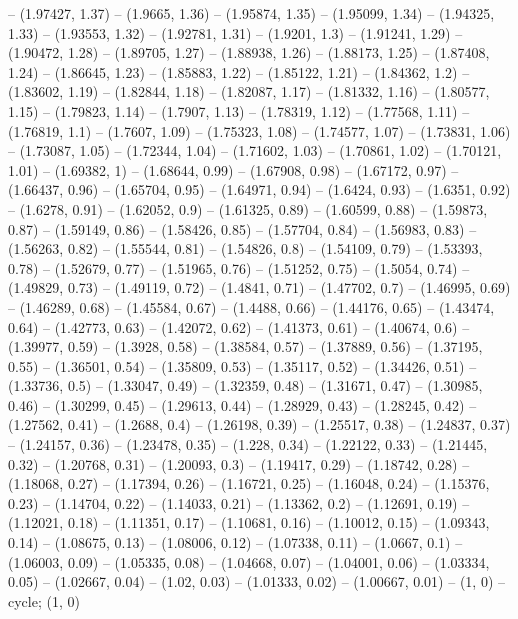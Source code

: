 -- (1.97427, 1.37)
-- (1.9665, 1.36)
-- (1.95874, 1.35)
-- (1.95099, 1.34)
-- (1.94325, 1.33)
-- (1.93553, 1.32)
-- (1.92781, 1.31)
-- (1.9201, 1.3)
-- (1.91241, 1.29)
-- (1.90472, 1.28)
-- (1.89705, 1.27)
-- (1.88938, 1.26)
-- (1.88173, 1.25)
-- (1.87408, 1.24)
-- (1.86645, 1.23)
-- (1.85883, 1.22)
-- (1.85122, 1.21)
-- (1.84362, 1.2)
-- (1.83602, 1.19)
-- (1.82844, 1.18)
-- (1.82087, 1.17)
-- (1.81332, 1.16)
-- (1.80577, 1.15)
-- (1.79823, 1.14)
-- (1.7907, 1.13)
-- (1.78319, 1.12)
-- (1.77568, 1.11)
-- (1.76819, 1.1)
-- (1.7607, 1.09)
-- (1.75323, 1.08)
-- (1.74577, 1.07)
-- (1.73831, 1.06)
-- (1.73087, 1.05)
-- (1.72344, 1.04)
-- (1.71602, 1.03)
-- (1.70861, 1.02)
-- (1.70121, 1.01)
-- (1.69382, 1)
-- (1.68644, 0.99)
-- (1.67908, 0.98)
-- (1.67172, 0.97)
-- (1.66437, 0.96)
-- (1.65704, 0.95)
-- (1.64971, 0.94)
-- (1.6424, 0.93)
-- (1.6351, 0.92)
-- (1.6278, 0.91)
-- (1.62052, 0.9)
-- (1.61325, 0.89)
-- (1.60599, 0.88)
-- (1.59873, 0.87)
-- (1.59149, 0.86)
-- (1.58426, 0.85)
-- (1.57704, 0.84)
-- (1.56983, 0.83)
-- (1.56263, 0.82)
-- (1.55544, 0.81)
-- (1.54826, 0.8)
-- (1.54109, 0.79)
-- (1.53393, 0.78)
-- (1.52679, 0.77)
-- (1.51965, 0.76)
-- (1.51252, 0.75)
-- (1.5054, 0.74)
-- (1.49829, 0.73)
-- (1.49119, 0.72)
-- (1.4841, 0.71)
-- (1.47702, 0.7)
-- (1.46995, 0.69)
-- (1.46289, 0.68)
-- (1.45584, 0.67)
-- (1.4488, 0.66)
-- (1.44176, 0.65)
-- (1.43474, 0.64)
-- (1.42773, 0.63)
-- (1.42072, 0.62)
-- (1.41373, 0.61)
-- (1.40674, 0.6)
-- (1.39977, 0.59)
-- (1.3928, 0.58)
-- (1.38584, 0.57)
-- (1.37889, 0.56)
-- (1.37195, 0.55)
-- (1.36501, 0.54)
-- (1.35809, 0.53)
-- (1.35117, 0.52)
-- (1.34426, 0.51)
-- (1.33736, 0.5)
-- (1.33047, 0.49)
-- (1.32359, 0.48)
-- (1.31671, 0.47)
-- (1.30985, 0.46)
-- (1.30299, 0.45)
-- (1.29613, 0.44)
-- (1.28929, 0.43)
-- (1.28245, 0.42)
-- (1.27562, 0.41)
-- (1.2688, 0.4)
-- (1.26198, 0.39)
-- (1.25517, 0.38)
-- (1.24837, 0.37)
-- (1.24157, 0.36)
-- (1.23478, 0.35)
-- (1.228, 0.34)
-- (1.22122, 0.33)
-- (1.21445, 0.32)
-- (1.20768, 0.31)
-- (1.20093, 0.3)
-- (1.19417, 0.29)
-- (1.18742, 0.28)
-- (1.18068, 0.27)
-- (1.17394, 0.26)
-- (1.16721, 0.25)
-- (1.16048, 0.24)
-- (1.15376, 0.23)
-- (1.14704, 0.22)
-- (1.14033, 0.21)
-- (1.13362, 0.2)
-- (1.12691, 0.19)
-- (1.12021, 0.18)
-- (1.11351, 0.17)
-- (1.10681, 0.16)
-- (1.10012, 0.15)
-- (1.09343, 0.14)
-- (1.08675, 0.13)
-- (1.08006, 0.12)
-- (1.07338, 0.11)
-- (1.0667, 0.1)
-- (1.06003, 0.09)
-- (1.05335, 0.08)
-- (1.04668, 0.07)
-- (1.04001, 0.06)
-- (1.03334, 0.05)
-- (1.02667, 0.04)
-- (1.02, 0.03)
-- (1.01333, 0.02)
-- (1.00667, 0.01)
-- (1, 0)
-- cycle;
\drawBand (1, 0)
